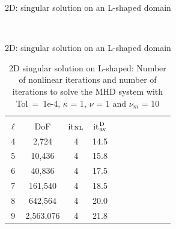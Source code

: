 \documentclass[12pt]{beamer}
\begin{document}
\begin{frame}{2D: singular solution on an L-shaped domain}

\begin{figure}
    \centering

   \\

\end{figure}
\end{frame}

\begin{frame}{2D: singular solution on an L-shaped domain}

\begin{table}
\centering
\begin{tabular}{ccccccccccc}
\hline
\hline\\[-0.35cm]
  $\ell$ & DoF &  it$_{\rm NL}$ &  it$_{\rm av}^{\rm D}$ \\[0.05cm]
\hline
\hline
 4 &    2,724 & 4 &         14.5\\
 5 &   10,436 & 4 &         15.8\\
 6 &   40,836 & 4 &         17.5\\
 7 &  161,540 & 4 &         18.5\\
 8 &  642,564 & 4 &         20.0\\
 9 &2,563,076 & 4 &         21.8\\

\hline\hline
\end{tabular}
\caption{2D singular solution on L-shaped: Number of nonlinear iterations and number of iterations to solve the MHD system with Tol~=~1e-4, $\kappa$ = 1, $\nu$ = 1 and $\nu_m$ = 10}
\label{tab:2DLshape}
\end{table}





\end{frame}
\end{document}
